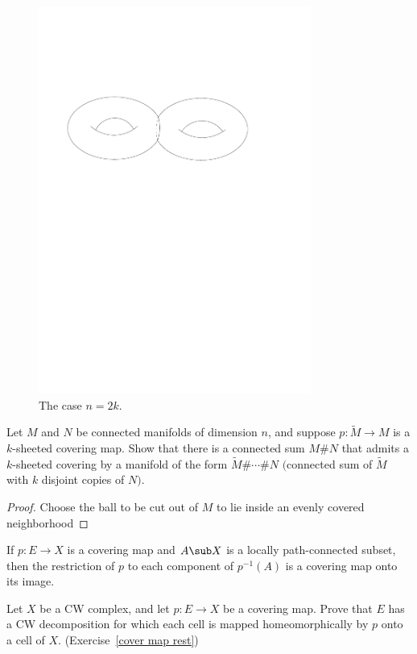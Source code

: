 \begin{example}
\begin{figure}[htbp]
\begin{minipage}{200pt}
\includegraphics[width=0.8\textwidth]{pictures/cover-by-tori-2}
\caption{The case $n=2k$.}
\end{minipage}
\end{figure}

\end{example}
\begin{exercise}
Let $M$ and $N$ be connected manifolds of dimension $n$, and suppose $p:\widetilde{M}\to M$ is a $k$-sheeted covering map. Show that there is a connected sum $M\#N$ that admits a $k$-sheeted covering by a manifold of the form $\widetilde{M}\#\cdots\#N$ $($connected sum of $\widetilde{M}$ with $k$ disjoint copies of $N$$)$.
\end{exercise}
\begin{proof}
Choose the ball to be cut out of $M$ to lie inside an evenly covered neighborhood
\end{proof}
\begin{exercise}\label{cover map rest}
If $p:E\to X$ is a covering map and $A\sub X$ is a locally path-connected subset, then the restriction of $p$ to each component of $p^{-1}(A)$ is a covering map onto its image.
\end{exercise}
\begin{exercise}
Let $X$ be a CW complex, and let $p:E\to X$ be a covering map. Prove that $E$ has a CW decomposition for which each cell is mapped homeomorphically by $p$ onto a cell 
of $X$.  (Exercise~\ref{cover map rest})
\end{exercise}
